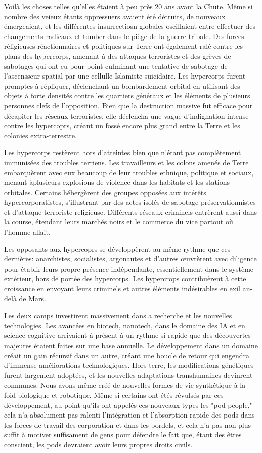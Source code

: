 Voilà les choses telles qu'elles étaient à peu près 20 ans avant la Chute. Même si nombre des veieux étants oppressuers avaient été détruits, de nouveaux émergeaient, et les différentes insurrectiosn globales oscillaient entre effectuer des changements radicaux et tomber dans le piège de la guerre tribale. Des forces réligieuses réactionnaires et politiques sur Terre ont également ralé contre les plans des hypercorps, amenant à des attaques terroristes et des grèves de sabotages qui ont eu pour point culminant une tentative de sabotage de l'ascensseur spatial par une cellulle Islamiste suicidaire. Les hypercorps furent promptes à répliquer, déclenchant un bombardement orbital en utilisant des objets à forte densités contre les quartiers généraux et les éléments de plusieurs personnes clefs de l'opposition. Bien que la destruction massive fut efficace pour décapiter les réseaux terroristes, elle déclencha une vague d'indignation intense contre les hypercoprs, créant un fossé encore plus grand entre la Terre et les colonies extra-terrestre. 

Les hypercorps restèrent hors d'atteintes bien que n'étant pas complètement immunisées des troubles terriens. Les travailleurs et les colons amenés de Terre embarquèrent avec eux beaucoup de leur troubles ethnique, politique et sociaux, menant àplusieurs explosions de violence dans les habitats et les stations orbitales. Certains hébergèrent des groupes opposées aux intérêts hypercorporatistes, s'illustrant par des actes isolés de sabotage préservationnistes et d'attaque terroriste religieuse. Différents réseaux criminels entrèrent aussi dans la course, étendant leurs marchés noirs et le commerce du vice partout où l'homme allait. 

Les opposants aux hypercoprs se développèrent au même rythme que ces dernières: anarchistes, socialistes, argonautes et d'autres œuvrèrent avec diligence pour établir leurs propre présence indépendante, essentiellement dans le système extérieur, hors de portée des hypercorps. Les hypercrops contribuèrent à cette croissance en envoyant leurs criminels et autres éléments indésirables en exil au-delà de Mars. 

Les deux camps investirent massivement dans a recherche et les nouvelles technologies. Les avancées en biotech, nanotech, dans le domaine des IA et en science cognitive arrivaient à présent à un rythme si rapide que des découvertes majeures étaient faites sur une base annuelle. Le développement dans un domaine créait un gain récursif dans un autre, créant une boucle de retour qui engendra d'immense améliorations technologiques. Hors-terre, les modifications génétiques furent largement adoptées, et les nouvelles adaptations transhumaines devinrent communes. Nous avons même créé de nouvelles formes de vie synthétique à la foid biologique et robotique. Même si certains ont étés révulsés par ces développement, au point qu'ils ont appelés ces nouveaux types les "pod people," cela n'a absolument pas ralenti l'intégration et l'absorption rapide des pods dans les forces de travail des corporation et dans les bordels, et cela n'a pas non plus suffit à motiver suffisament de gens pour défendre le fait que, étant des êtres conscient, les pods devraient avoir leurs propres droits civils. 

